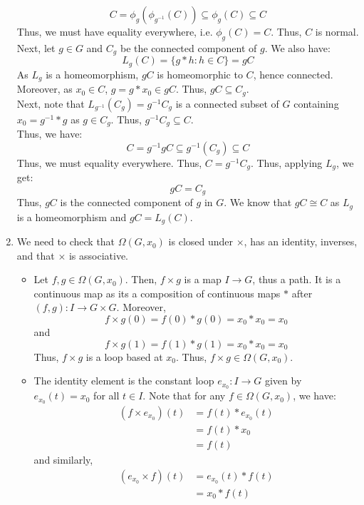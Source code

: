 \documentclass[12pt]{article}
\begin{document}
\begin{solution}
\begin{enumerate}
        \[ C = \phi_{g}(\phi_{g^{-1}}(C)) \subseteq \phi_{g}(C) \subseteq C \]        
        Thus, we must have equality everywhere, i.e. $\phi_g(C) = C$. Thus, $C$ is normal. \bbni
        Next, let $g \in G$ and $C_g$ be the connected component of $g$. We also have:
        \[ L_g(C) = \{g\ast h : h \in C\} = gC\]
        As $L_g$ is a homeomorphism, $gC$ is homeomorphic to $C$, hence connected. Moreover, as $x_0 \in C$, $g = g \ast x_0 \in gC$. Thus, $gC \subseteq C_g$. \\
        Next, note that $L_{g^{-1}}(C_g) = g^{-1}C_g$ is a connected subset of $G$ containing $x_0 = g^{-1} \ast g$ as $g \in C_g$. Thus, $g^{-1}C_g \subseteq C$. \\
        Thus, we have:
        \[ C = g^{-1}gC \subseteq g^{-1}(C_g) \subseteq C \]
        Thus, we must equality everywhere. Thus, $C = g^{-1}C_g$. Thus, applying $L_{g}$, we get:
        \[ gC = C_g\]
        Thus, $gC$ is the connected component of $g$ in $G$. We know that $gC \cong C$ as $L_g$ is a homeomorphism and $gC = L_g(C)$. 
        \item We need to check that $\Omega(G, x_0)$ is closed under $\times$, has an identity, inverses, and that $\times$ is associative. 
        \begin{itemize}
            \item Let $f, g \in \Omega(G, x_0)$. Then, $f \times g$ is a map $I \to G$, thus a path. It is a continuous map as its a composition of continuous maps $\ast$ after $(f, g): I \to G \times G$. Moreover, 
            \[ f \times g(0) = f(0) \ast g(0) = x_0 \ast x_0 = x_0\]
            and
            \[ f \times g(1) = f(1) \ast g(1) = x_0 \ast x_0 = x_0\]
            Thus, $f \times g$ is a loop based at $x_0$. Thus, $f \times g \in \Omega(G, x_0)$. 
            \item The identity element is the constant loop $e_{x_0}: I \to G$ given by $e_{x_0}(t) = x_0$ for all $t \in I$. Note that for any $f \in \Omega(G, x_0)$, we have:
            \begin{align*}
                (f \times e_{x_0})(t) &= f(t) \ast e_{x_0}(t) \\
                &= f(t) \ast x_0 \\
                &= f(t)
            \end{align*}
            and similarly, 
            \begin{align*}
                (e_{x_0} \times f)(t) &= e_{x_0}(t) \ast f(t) \\
                &= x_0 \ast f(t) \\

\end{align*}
\end{itemize}
\end{enumerate}
\end{solution}
\end{document}
